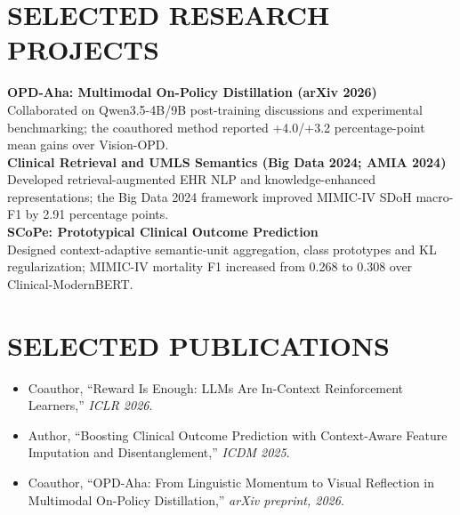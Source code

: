 \documentclass[10pt, letterpaper]{article}
\begin{document}
\section{SELECTED RESEARCH PROJECTS}
\textbf{OPD-Aha: Multimodal On-Policy Distillation (arXiv 2026)}\\[-1pt]
Collaborated on Qwen3.5-4B/9B post-training discussions and experimental benchmarking; the coauthored method reported +4.0/+3.2 percentage-point mean gains over Vision-OPD.\\[3pt]
\textbf{Clinical Retrieval and UMLS Semantics (Big Data 2024; AMIA 2024)}\\[-1pt]
Developed retrieval-augmented EHR NLP and knowledge-enhanced representations; the Big Data 2024 framework improved MIMIC-IV SDoH macro-F1 by 2.91 percentage points.\\[3pt]
\textbf{SCoPe: Prototypical Clinical Outcome Prediction}\\[-1pt]
Designed context-adaptive semantic-unit aggregation, class prototypes and KL regularization; MIMIC-IV mortality F1 increased from 0.268 to 0.308 over Clinical-ModernBERT.\\[3pt]
\section{SELECTED PUBLICATIONS}
\begin{itemize}
\item Coauthor, ``Reward Is Enough: LLMs Are In-Context Reinforcement Learners,'' \textit{ICLR 2026}.
\item Author, ``Boosting Clinical Outcome Prediction with Context-Aware Feature Imputation and Disentanglement,'' \textit{ICDM 2025}.
\item Coauthor, ``OPD-Aha: From Linguistic Momentum to Visual Reflection in Multimodal On-Policy Distillation,'' \textit{arXiv preprint, 2026}.
\end{itemize}
\end{document}
